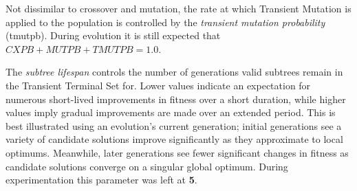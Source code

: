 \documentclass[a4paper, twocolumn]{article}
\begin{document}
Not dissimilar to crossover and mutation, the rate at which Transient Mutation is applied to the population is controlled by the \textit{transient mutation probability} (tmutpb). During evolution it is still expected that $CXPB + MUTPB + TMUTPB = 1.0$.

The \textit{subtree lifespan} controls the number of generations valid subtrees remain in the Transient Terminal Set for. Lower values indicate an expectation for numerous short-lived improvements in fitness over a short duration, while higher values imply gradual improvements are made over an extended period. This is best illustrated using an evolution's current generation; initial generations see a variety of candidate solutions improve significantly as they approximate to local optimums. Meanwhile, later generations see fewer significant changes in fitness as candidate solutions converge on a singular global optimum. During experimentation this parameter was left at \textbf{5}.
\end{document}
